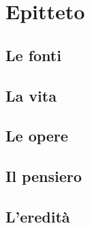 \chapter{Epitteto}

\section{Le fonti}

\section{La vita}

\section{Le opere}

\section{Il pensiero}

\section{L'eredità}
